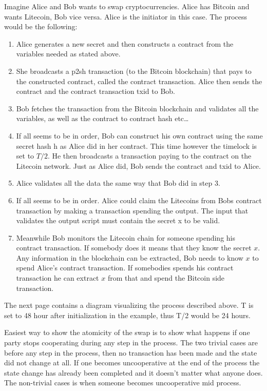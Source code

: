 Imagine Alice and Bob wants to swap cryptocurrencies. Alice has Bitcoin and wants Litecoin, Bob vice versa. Alice is the initiator in this case. The process would be the following:
\begin{enumerate}
	\item Alice generates a new secret and then constructs a contract from the variables needed as stated above.
	\item She broadcasts a p2sh transaction (to the Bitcoin blockchain) that pays to the constructed contract, called the contract transaction. Alice then sends the contract and the contract transaction txid to Bob.
	\item Bob fetches the transaction from the Bitcoin blockchain and validates all the variables, as well as the contract to contract hash etc\dots
	\item If all seems to be in order, Bob can construct his own contract using the same secret hash h as Alice did in her contract. This time however the timelock is set to $T/2$. He then broadcasts a transaction paying to the contract on the Litecoin network. Just as Alice did, Bob sends the contract and txid to Alice.
	\item Alice validates all the data the same way that Bob did in step 3. 
	\item If all seems to be in order. Alice could claim the Litecoins from Bobs contract transaction by making a transaction spending the output. The input that validates the output script must contain the secret x to be valid.
	\item Meanwhile Bob monitors the Litecoin chain for someone spending his contract transaction. If somebody does it means that they know the secret $x$. Any information in the blockchain can be extracted, Bob needs to know $x$ to spend Alice's contract transaction. If somebodies spends his contract transaction he can extract $x$ from that and spend the Bitcoin side transaction.
\end{enumerate}

The next page contains a diagram visualizing the process described above. T is set to 48 hour after initialization in the example, thus T/2 would be 24 hours.

Easiest way to show the atomicity of the swap is to show what happens if one party stops cooperating during any step in the process. The two trivial cases are before any step in the process, then no transaction has been made and the state did not change at all. If one becomes uncooperative at the end of the process the state change has already been completed and it doesn't matter what anyone does. The non-trivial cases is when someone becomes uncooperative mid process.\\

